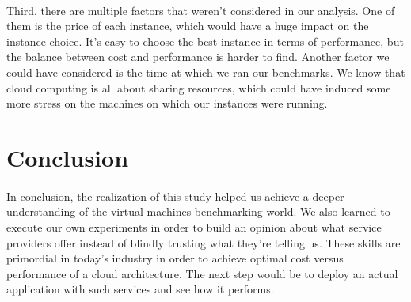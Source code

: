 \documentclass[11pt]{article}
\begin{document}
		\paragraph{} Third, there are multiple factors that weren't considered
		in our analysis. One of them is the price of each instance, which would
		have a huge impact on the instance choice. It's easy to choose the best
		instance in terms of performance, but the balance between cost and
		performance is harder to find. Another factor we could have considered
		is the time at which we ran our benchmarks. We know that cloud computing
		is all about sharing resources, which could have induced some more
		stress on the machines on which our instances were running.

\section{Conclusion}
		\paragraph{} In conclusion, the realization of this study helped us
		achieve a deeper understanding of the virtual machines benchmarking
		world. We also learned to execute our own experiments in order to
		build an opinion about what service providers offer instead of blindly
		trusting what they're telling us. These skills
		are primordial in today's industry in order to achieve optimal cost
		versus performance of a cloud architecture. The next step would be to
		deploy an actual application with such services and see how it performs.
\end{document}
